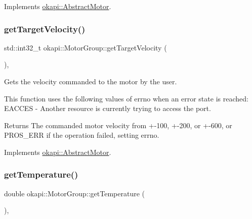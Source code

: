 Implements \mbox{\hyperlink{classokapi_1_1AbstractMotor_a144377e461ec5801289c37bab5132cce}{okapi\+::\+Abstract\+Motor}}.

\mbox{\label{classokapi_1_1MotorGroup_a841736ae664104fb38ffff33ef763394}} 
\subsubsection{\texorpdfstring{getTargetVelocity()}{getTargetVelocity()}}
{\footnotesize\ttfamily std\+::int32\+\_\+t okapi\+::\+Motor\+Group\+::get\+Target\+Velocity (\begin{DoxyParamCaption}{ }\end{DoxyParamCaption})\hspace{0.3cm}{\ttfamily [override]}, {\ttfamily [virtual]}}

Gets the velocity commanded to the motor by the user.

This function uses the following values of errno when an error state is reached\+: E\+A\+C\+C\+ES -\/ Another resource is currently trying to access the port.

\begin{DoxyReturn}{Returns}
The commanded motor velocity from +-\/100, +-\/200, or +-\/600, or P\+R\+O\+S\+\_\+\+E\+RR if the operation failed, setting errno. 
\end{DoxyReturn}


Implements \mbox{\hyperlink{classokapi_1_1AbstractMotor_a96b02cca7b51f75c01d2d22aab474fe4}{okapi\+::\+Abstract\+Motor}}.

\mbox{\label{classokapi_1_1MotorGroup_acba91d770dbc7e38f59070e8d5957d6d}} 
\subsubsection{\texorpdfstring{getTemperature()}{getTemperature()}}
{\footnotesize\ttfamily double okapi\+::\+Motor\+Group\+::get\+Temperature (\begin{DoxyParamCaption}{ }\end{DoxyParamCaption})\hspace{0.3cm}{\ttfamily [override]}, {\ttfamily [virtual]}}

